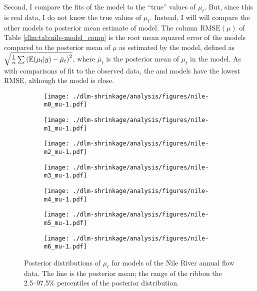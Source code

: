 \documentclass[12pt]{article}
\begin{document}
Second, I compare the fits of the model to the ``true'' values of $\mu_{t}$.
But, since this is real data, I do not know the true values of $\mu_{t}$.
Instead, I will will compare the other models to posterior mean estimate of  model.
The column $\textrm{RMSE}(\mu)$ of Table \ref{dlm:tab:nile-model_comp} is the root mean squared error of the models compared to the posterior mean of $\mu$ as estimated by the  model, defined as $\sqrt{\frac{1}{n} \sum {(\operatorname{E}(\mu_{t}| y) - \bar{\mu}_{t})}^{2}}$, where $\bar{\mu}_{t}$ is the posterior mean of $\mu_{t}$ in the  model.
As with comparisons of fit to the observed data, the  and  models have the lowest RMSE, although the  model is close.


\begin{figure}[htpb!]
  \centering
  \begin{subfigure}[b]{0.5\linewidth}
    \texttt{[image: ./dlm-shrinkage/analysis/figures/nile-m0\_mu-1.pdf]}
    \caption{}
  \end{subfigure}%
  \begin{subfigure}[b]{0.5\linewidth}
    \texttt{[image: ./dlm-shrinkage/analysis/figures/nile-m1\_mu-1.pdf]}
    \caption{}
  \end{subfigure}
  \begin{subfigure}[b]{0.5\linewidth}
    \texttt{[image: ./dlm-shrinkage/analysis/figures/nile-m2\_mu-1.pdf]}
    \caption{}
  \end{subfigure}%
  \begin{subfigure}[b]{0.5\linewidth}
    \texttt{[image: ./dlm-shrinkage/analysis/figures/nile-m3\_mu-1.pdf]}
    \caption{}
  \end{subfigure}
  \begin{subfigure}[b]{0.5\linewidth}
    \texttt{[image: ./dlm-shrinkage/analysis/figures/nile-m4\_mu-1.pdf]}
    \caption{}
  \end{subfigure}%
  \begin{subfigure}[b]{0.5\linewidth}
    \texttt{[image: ./dlm-shrinkage/analysis/figures/nile-m5\_mu-1.pdf]}
    \caption{}
  \end{subfigure}
  \begin{subfigure}[b]{0.5\linewidth}
    \texttt{[image: ./dlm-shrinkage/analysis/figures/nile-m6\_mu-1.pdf]}
    \caption{}
  \end{subfigure}
  \caption[Posterior distributions of $\mu_t$ for models of the Nile River annual flow data.]{Posterior distributions of $\mu_t$ for models of the Nile River annual flow data. The line is the posterior mean; the range of the ribbon the 2.5--97.5\% percentiles of the posterior distribution.}
  \label{dlm:fig:nile_mu_posterior}
\end{figure}
\end{document}
